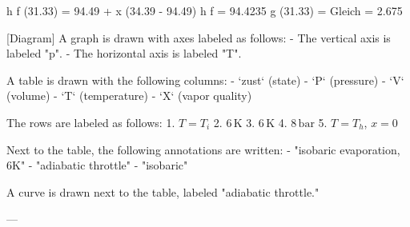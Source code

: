 h f (31.33) = 94.49 + x (34.39 - 94.49)  
h f = 94.4235  
g (31.33) = Gleich = 2.675  

[Diagram]  
A graph is drawn with axes labeled as follows:  
- The vertical axis is labeled "p".  
- The horizontal axis is labeled "T".

A table is drawn with the following columns:  
- `zust` (state)  
- `P` (pressure)  
- `V` (volume)  
- `T` (temperature)  
- `X` (vapor quality)  

The rows are labeled as follows:  
1. \( T = T_i \)  
2. \( 6 \, \text{K} \)  
3. \( 6 \, \text{K} \)  
4. \( 8 \, \text{bar} \)  
5. \( T = T_h \), \( x = 0 \)  

Next to the table, the following annotations are written:  
- "isobaric evaporation, 6K"  
- "adiabatic throttle"  
- "isobaric"  

A curve is drawn next to the table, labeled "adiabatic throttle."  

---